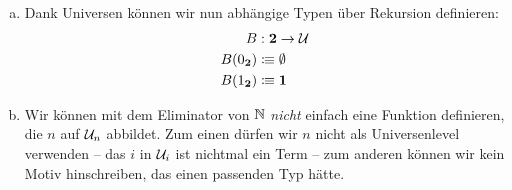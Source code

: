 \begin{beispiel}
\begin{enumerate}[(a)]
\item Dank Universen können wir nun abhängige Typen über Rekursion definieren:
  \begin{align*}
    B&:\mathbf{2}\to\mathcal{U} \\
    B(0_{\mathbf{2}})&\vcentcolon\mspace{-1.2mu}\equiv \emptyset \\
    B(1_{\mathbf{2}})&\vcentcolon\mspace{-1.2mu}\equiv \mathbf{1}
  \end{align*}
\item Wir können mit dem Eliminator von $\mathbb{N}$ \emph{nicht} einfach eine Funktion definieren,
  die $n$ auf $\mathcal{U}_n$ abbildet. Zum einen dürfen wir $n$ nicht als Universenlevel verwenden --
  das $i$ in $\mathcal{U}_i$ ist nichtmal ein Term -- zum anderen können wir kein Motiv hinschreiben,
  das einen passenden Typ hätte.
\end{enumerate}
\end{beispiel}
